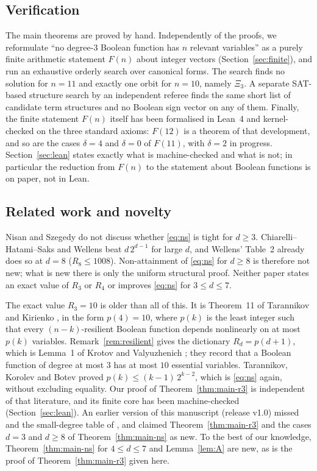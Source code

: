 \documentclass[11pt,reqno]{amsart}
\theoremstyle{plain}
\theoremstyle{definition}
\numberwithin{theorem}{section}
\newcommand{\XiC}{\Xi}
\newif\ifleandone
\newcommand{\leanstate}[2]{\ifleandone #1\else #2\fi}
\begin{document}
\subsection{Verification}
The main theorems are proved by hand. Independently of the proofs, we reformulate
``no degree-$3$ Boolean function has $n$ relevant variables'' as a purely finite arithmetic
statement $F(n)$ about integer vectors (Section~\ref{sec:finite}), and run an exhaustive
orderly search over canonical forms. The search finds no solution for $n = 11$ and exactly one
orbit for $n = 10$, namely $\XiC_3$. A separate SAT-based structure search by an independent
referee finds the same short list of candidate term structures and no Boolean sign vector on
any of them. Finally, the finite statement $F(n)$ itself has been formalised in Lean~4 and
kernel-checked on the three standard axioms: $F(12)$ is a theorem of that development, and
\leanstate{so is $F(11)$.}{so are the cases $\delta = 4$ and $\delta = 0$ of $F(11)$, with
$\delta = 2$ in progress.} Section~\ref{sec:lean} states exactly what is machine-checked and
what is not; in particular the reduction from $F(n)$ to the statement about Boolean functions
is on paper, not in Lean.

\subsection{Related work and novelty}
Nisan and Szegedy \cite{NS94} do not discuss whether \eqref{eq:ns} is tight for $d \ge 3$.
Chiarelli--Hatami--Saks \cite{CHS20} and Wellens \cite{Wel19,Wel22} beat $d\,2^{d-1}$ for large
$d$, and Wellens' Table~2 \cite{Wel19} already does so at $d = 8$ ($R_8 \le 1008$). Non-attainment
of \eqref{eq:ns} for $d \ge 8$ is therefore not new; what is new there is only the uniform
structural proof. Neither paper states an exact value of $R_3$ or $R_4$ or improves
\eqref{eq:ns} for $3 \le d \le 7$.

The exact value $R_3 = 10$ is older than all of this. It is Theorem~11 of Tarannikov and Kirienko
\cite{TK00}, in the form $p(4) = 10$, where $p(k)$ is the least integer such that every
$(n-k)$-resilient Boolean function depends nonlinearly on at most $p(k)$ variables.
Remark~\ref{rem:resilient} gives the dictionary $R_d = p(d+1)$, which is Lemma~1 of Krotov and
Valyuzhenich \cite{KV24}; they record that a Boolean function of degree at most $3$ has at most
$10$ essential variables. Tarannikov, Korolev and Botev \cite{TKB01} proved
$p(k) \le (k-1)\,2^{k-2}$, which is \eqref{eq:ns} again, without excluding equality. Our proof of
Theorem~\ref{thm:main-r3} is independent of that literature, and its finite core has been
machine-checked (Section~\ref{sec:lean}). An earlier version of this manuscript (release v1.0)
missed \cite{TK00,TKB01,KV24} and the small-degree table of \cite{Wel19}, and claimed
Theorem~\ref{thm:main-r3} and the cases $d = 3$ and $d \ge 8$ of Theorem~\ref{thm:main-ns} as new.
To the best of our knowledge, Theorem~\ref{thm:main-ns} for $4 \le d \le 7$ and
Lemma~\ref{lem:A} are new, as is the proof of Theorem~\ref{thm:main-r3} given here.
\end{document}
